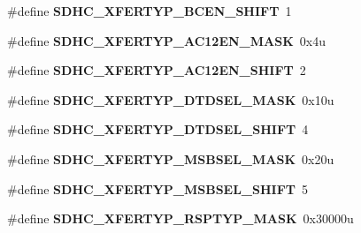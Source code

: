 \begin{DoxyCompactItemize}
\item 
\#define {\bfseries S\+D\+H\+C\+\_\+\+X\+F\+E\+R\+T\+Y\+P\+\_\+\+B\+C\+E\+N\+\_\+\+S\+H\+I\+FT}~1\hypertarget{group__SDHC__Register__Masks_ga25223c582d559cd31d3de92191c681c7}{}\label{group__SDHC__Register__Masks_ga25223c582d559cd31d3de92191c681c7}

\item 
\#define {\bfseries S\+D\+H\+C\+\_\+\+X\+F\+E\+R\+T\+Y\+P\+\_\+\+A\+C12\+E\+N\+\_\+\+M\+A\+SK}~0x4u\hypertarget{group__SDHC__Register__Masks_ga1940add41a5918da9c0b045597e0c497}{}\label{group__SDHC__Register__Masks_ga1940add41a5918da9c0b045597e0c497}

\item 
\#define {\bfseries S\+D\+H\+C\+\_\+\+X\+F\+E\+R\+T\+Y\+P\+\_\+\+A\+C12\+E\+N\+\_\+\+S\+H\+I\+FT}~2\hypertarget{group__SDHC__Register__Masks_ga2e8fdd12bcab3fa4d4e6823eabaf65a0}{}\label{group__SDHC__Register__Masks_ga2e8fdd12bcab3fa4d4e6823eabaf65a0}

\item 
\#define {\bfseries S\+D\+H\+C\+\_\+\+X\+F\+E\+R\+T\+Y\+P\+\_\+\+D\+T\+D\+S\+E\+L\+\_\+\+M\+A\+SK}~0x10u\hypertarget{group__SDHC__Register__Masks_ga608ac3efa7417c8763511d336a8cb6c7}{}\label{group__SDHC__Register__Masks_ga608ac3efa7417c8763511d336a8cb6c7}

\item 
\#define {\bfseries S\+D\+H\+C\+\_\+\+X\+F\+E\+R\+T\+Y\+P\+\_\+\+D\+T\+D\+S\+E\+L\+\_\+\+S\+H\+I\+FT}~4\hypertarget{group__SDHC__Register__Masks_ga669da614be8810a42499b583e2ce2617}{}\label{group__SDHC__Register__Masks_ga669da614be8810a42499b583e2ce2617}

\item 
\#define {\bfseries S\+D\+H\+C\+\_\+\+X\+F\+E\+R\+T\+Y\+P\+\_\+\+M\+S\+B\+S\+E\+L\+\_\+\+M\+A\+SK}~0x20u\hypertarget{group__SDHC__Register__Masks_gafb2312829ed2798040e4b2b0f17a0114}{}\label{group__SDHC__Register__Masks_gafb2312829ed2798040e4b2b0f17a0114}

\item 
\#define {\bfseries S\+D\+H\+C\+\_\+\+X\+F\+E\+R\+T\+Y\+P\+\_\+\+M\+S\+B\+S\+E\+L\+\_\+\+S\+H\+I\+FT}~5\hypertarget{group__SDHC__Register__Masks_ga9f13f1a35f73d15da1cb2e89a6919e30}{}\label{group__SDHC__Register__Masks_ga9f13f1a35f73d15da1cb2e89a6919e30}

\item 
\#define {\bfseries S\+D\+H\+C\+\_\+\+X\+F\+E\+R\+T\+Y\+P\+\_\+\+R\+S\+P\+T\+Y\+P\+\_\+\+M\+A\+SK}~0x30000u\hypertarget{group__SDHC__Register__Masks_ga0ed8f044a988ab8f1017f9f17c6087a5}{}\label{group__SDHC__Register__Masks_ga0ed8f044a988ab8f1017f9f17c6087a5}


\end{DoxyCompactItemize}
